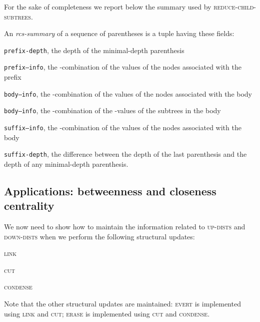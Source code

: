 \documentclass[a4paper,USenglish]{lipics}
\newcommand{\var}[1]{\textrm{\texttt{#1}}}
\begin{document}
For the sake of completeness we report below the summary used by \textsc{reduce-child-subtrees}. 
\begin{definition}
An \emph{rcs-summary} of a sequence of parentheses is a tuple having these fields:
\begin{compactitem}
	\item {{\var{prefix-depth}}}, the depth of the minimal-depth parenthesis
	\item {{\var{prefix--info}}}, the -combination of the values of the nodes associated with the prefix 
	\item {{\var{body--info}}}, the -combination of the values of the nodes associated with the body
	\item {{\var{body--info}}}, the -combination of the -values of the subtrees in the body
	\item {{\var{suffix--info}}}, the -combination of the values of the nodes associated with the body
	\item {{\var{suffix-depth}}}, the difference between the depth of the last parenthesis and the depth of any minimal-depth parenthesis.
\end{compactitem}
\end{definition}

\subsection{Applications: betweenness and closeness centrality}





We now need to show how to maintain the information related to \textsc{up-dists} and \textsc{down-dists} when we perform the following structural updates:
	\begin{compactitem}
		\item \textsc{link}
		\item \textsc{cut}
		\item \textsc{condense}
	\end{compactitem}
	Note that the other structural updates are maintained: \textsc{evert} is implemented using \textsc{link} and  \textsc{cut}; \textsc{erase} is implemented using \textsc{cut} and  \textsc{condense}.
\end{document}
